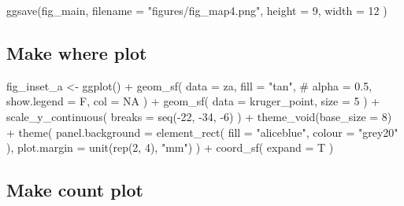 \documentclass[]{article}
\newenvironment{Shaded}{}{}
\newcommand{\CommentTok}[1]{\textcolor[rgb]{0.00,0.50,0.00}{#1}}
\newcommand{\DataTypeTok}[1]{#1}
\newcommand{\DecValTok}[1]{#1}
\newcommand{\KeywordTok}[1]{\textcolor[rgb]{0.00,0.00,1.00}{#1}}
\newcommand{\NormalTok}[1]{#1}
\newcommand{\OperatorTok}[1]{#1}
\newcommand{\OtherTok}[1]{\textcolor[rgb]{1.00,0.25,0.00}{#1}}
\newcommand{\StringTok}[1]{\textcolor[rgb]{0.00,0.50,0.50}{#1}}
\begin{document}
\begin{Shaded}
\begin{Highlighting}[]
\KeywordTok{ggsave}\NormalTok{(fig_main,}
  \DataTypeTok{filename =} \StringTok{"figures/fig_map4.png"}\NormalTok{,}
  \DataTypeTok{height =} \DecValTok{9}\NormalTok{, }\DataTypeTok{width =} \DecValTok{12}
\NormalTok{)}
\end{Highlighting}
\end{Shaded}

\hypertarget{make-where-plot}{%
\subsection{Make where plot}\label{make-where-plot}}

\begin{Shaded}
\begin{Highlighting}[]
\NormalTok{fig_inset_a <-}
\StringTok{  }\KeywordTok{ggplot}\NormalTok{() }\OperatorTok{+}
\StringTok{  }\KeywordTok{geom_sf}\NormalTok{(}
    \DataTypeTok{data =}\NormalTok{ za,}
    \DataTypeTok{fill =} \StringTok{"tan"}\NormalTok{,}
    \CommentTok{# alpha = 0.5,}
    \DataTypeTok{show.legend =}\NormalTok{ F,}
    \DataTypeTok{col =} \OtherTok{NA}
\NormalTok{  ) }\OperatorTok{+}
\StringTok{  }\KeywordTok{geom_sf}\NormalTok{(}
    \DataTypeTok{data =}\NormalTok{ kruger_point,}
    \DataTypeTok{size =} \DecValTok{5}
\NormalTok{  ) }\OperatorTok{+}
\StringTok{  }\KeywordTok{scale_y_continuous}\NormalTok{(}
    \DataTypeTok{breaks =} \KeywordTok{seq}\NormalTok{(}\OperatorTok{-}\DecValTok{22}\NormalTok{, }\DecValTok{-34}\NormalTok{, }\DecValTok{-6}\NormalTok{)}
\NormalTok{  ) }\OperatorTok{+}
\StringTok{  }\KeywordTok{theme_void}\NormalTok{(}\DataTypeTok{base_size =} \DecValTok{8}\NormalTok{) }\OperatorTok{+}
\StringTok{  }\KeywordTok{theme}\NormalTok{(}
    \DataTypeTok{panel.background =} \KeywordTok{element_rect}\NormalTok{(}
      \DataTypeTok{fill =} \StringTok{"aliceblue"}\NormalTok{,}
      \DataTypeTok{colour =} \StringTok{"grey20"}
\NormalTok{    ),}
    \DataTypeTok{plot.margin =} \KeywordTok{unit}\NormalTok{(}\KeywordTok{rep}\NormalTok{(}\DecValTok{2}\NormalTok{, }\DecValTok{4}\NormalTok{), }\StringTok{"mm"}\NormalTok{)}
\NormalTok{  ) }\OperatorTok{+}
\StringTok{  }\KeywordTok{coord_sf}\NormalTok{(}
    \DataTypeTok{expand =}\NormalTok{ T}
\NormalTok{  )}
\end{Highlighting}
\end{Shaded}

\hypertarget{make-count-plot}{%
\subsection{Make count plot}\label{make-count-plot}}
\end{document}
